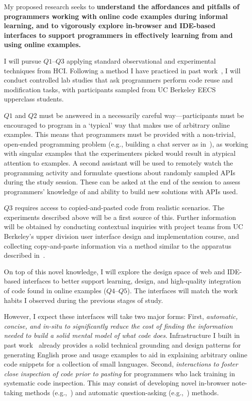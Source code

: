 \documentclass[12pt]{memoir}
\begin{document}

My proposed research seeks to \textbf{understand the affordances and pitfalls of programmers working with online code examples during informal learning, and to vigorously explore in-browser and IDE-based interfaces to support programmers in effectively learning from and using online examples.}


I will pursue $Q1$--$Q3$ applying standard observational and experimental techniques from HCI\@.
Following a method I have practiced in past work~\cite{head_tutorons_2015}, I will conduct controlled lab studies that ask programmers perform code reuse and modification tasks, with participants sampled from UC Berkeley EECS upperclass students.

$Q1$ and $Q2$ must be answered in a necessarily careful way---participants must be encouraged to program in a `typical' way that makes use of arbitrary online examples.
This means that programmers must be provided with a non-trivial, open-ended programming problem (e.g., building a chat server as in~\cite{brandt_two_2009}), as working with singular examples that the experimenters picked would result in atypical attention to examples.
A second assistant will be used to remotely watch the programming activity and formulate questions about randomly sampled APIs during the study session.
These can be asked at the end of the session to assess programmers' knowledge of and ability to build new solutions with APIs used.

$Q3$ requires access to copied-and-pasted code from realistic scenarios.
The experiments described above will be a first source of this.
Further information will be obtained by conducting contextual inquiries with project teams from UC Berkeley's upper division user interface design and implementation course, and collecting copy-and-paste information via a method similar to the apparatus described in~\cite{kim_ethnographic_2004}.

On top of this novel knowledge, I will explore the design space of web and IDE-based interfaces to better support learning, design, and high-quality integration of code found in online examples ($Q4$--$Q5$).
The interfaces will match the work habits I observed during the previous stages of study.

However, I expect these interfaces will take two major forms:
First, \emph{automatic, concise, and in-situ to significantly reduce the cost of finding the information needed to build a solid mental model of what code does}.
Infrastructure I built in past work~\cite{head_tutorons_2015} already provides a solid technical grounding and design patterns for generating English prose and usage examples to aid in explaining arbitrary online code snippets for a collection of small languages.
Second, \emph{interactions to foster close inspection of code prior to pasting} for programmers who lack training in systematic code inspection.
This may consist of developing novel in-browser note-taking methods (e.g.,~\cite{bauer_selection-based_2007}) and automatic question-asking (e.g.,~\cite{mitkov_computer-aided_2003}) methods.
\end{document}
